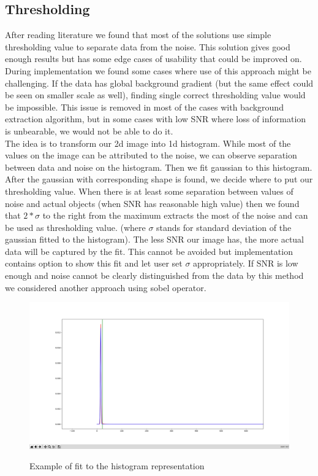 \documentclass[12pt, a4paper, oneside]{book}
\begin{document}
\subsection{Thresholding}

After reading literature we found that most of the solutions use simple thresholding value to separate data from the noise.
This solution gives good enough results but has some edge cases of usability that could be improved on.
During implementation we found some cases where use of this approach might be challenging.
If the data has global background gradient (but the same effect could be seen on smaller scale as well), finding single correct thresholding value would be impossible.
This issue is removed in most of the cases with background extraction algorithm, but in some cases with low SNR where loss of information is unbearable, we would not be able to do it.
\\
The idea is to transform our 2d image into 1d histogram.
While most of the values on the image can be attributed to the noise, we can observe separation between data and noise on the histogram.
Then we fit gaussian to this histogram.
After the gaussian with corresponding shape is found, we decide where to put our thresholding value.
When there is at least some separation between values of noise and actual objects (when SNR has reasonable high value) then we found that $2 * \sigma$ to the right from the maximum extracts the most of the noise and can be used as thresholding value. (where $\sigma$ stands for standard deviation of the gaussian fitted to the histogram).
The less SNR our image has, the more actual data will be captured by the fit.
This cannot be avoided but implementation contains option to show this fit and let user set $\sigma$ appropriately.
If SNR is low enough and noise cannot be clearly distinguished from the data by this method we considered another approach using sobel operator.

\begin{figure}[H]
    \begin{center}
        \includegraphics[scale=0.95]{images/hist_fit_far.png}
        \label{img:background_initial_guess}
        \caption{Example of fit to the histogram representation}
    \end{center}
\end{figure}
\end{document}
